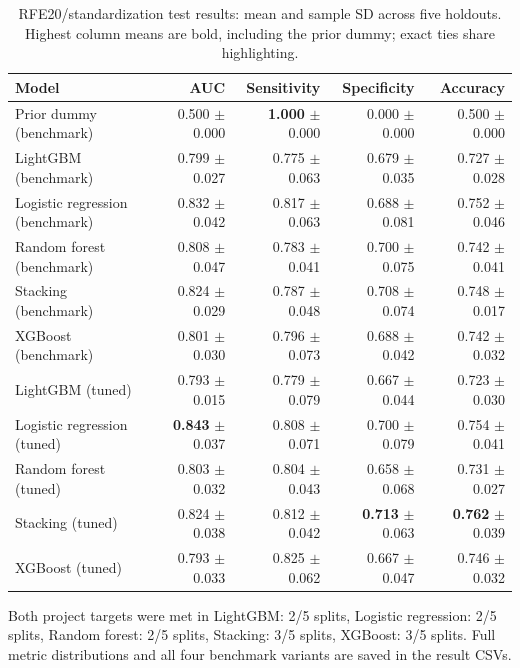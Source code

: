\begin{table}[H]
\centering\small
\caption{RFE20/standardization test results: mean and sample SD across five holdouts. Highest column means are bold, including the prior dummy; exact ties share highlighting.}
\label{tab:holdout-results}
\begin{tabular}{lrrrr}
\toprule
Model & AUC & Sensitivity & Specificity & Accuracy \\
\midrule
Prior dummy (benchmark) & 0.500 $\pm$ 0.000 & \textbf{1.000} $\pm$ 0.000 & 0.000 $\pm$ 0.000 & 0.500 $\pm$ 0.000 \\
LightGBM (benchmark) & 0.799 $\pm$ 0.027 & 0.775 $\pm$ 0.063 & 0.679 $\pm$ 0.035 & 0.727 $\pm$ 0.028 \\
Logistic regression (benchmark) & 0.832 $\pm$ 0.042 & 0.817 $\pm$ 0.063 & 0.688 $\pm$ 0.081 & 0.752 $\pm$ 0.046 \\
Random forest (benchmark) & 0.808 $\pm$ 0.047 & 0.783 $\pm$ 0.041 & 0.700 $\pm$ 0.075 & 0.742 $\pm$ 0.041 \\
Stacking (benchmark) & 0.824 $\pm$ 0.029 & 0.787 $\pm$ 0.048 & 0.708 $\pm$ 0.074 & 0.748 $\pm$ 0.017 \\
XGBoost (benchmark) & 0.801 $\pm$ 0.030 & 0.796 $\pm$ 0.073 & 0.688 $\pm$ 0.042 & 0.742 $\pm$ 0.032 \\
LightGBM (tuned) & 0.793 $\pm$ 0.015 & 0.779 $\pm$ 0.079 & 0.667 $\pm$ 0.044 & 0.723 $\pm$ 0.030 \\
Logistic regression (tuned) & \textbf{0.843} $\pm$ 0.037 & 0.808 $\pm$ 0.071 & 0.700 $\pm$ 0.079 & 0.754 $\pm$ 0.041 \\
Random forest (tuned) & 0.803 $\pm$ 0.032 & 0.804 $\pm$ 0.043 & 0.658 $\pm$ 0.068 & 0.731 $\pm$ 0.027 \\
Stacking (tuned) & 0.824 $\pm$ 0.038 & 0.812 $\pm$ 0.042 & \textbf{0.713} $\pm$ 0.063 & \textbf{0.762} $\pm$ 0.039 \\
XGBoost (tuned) & 0.793 $\pm$ 0.033 & 0.825 $\pm$ 0.062 & 0.667 $\pm$ 0.047 & 0.746 $\pm$ 0.032 \\
\bottomrule
\end{tabular}
\end{table}
Both project targets were met in LightGBM: 2/5 splits, Logistic regression: 2/5 splits, Random forest: 2/5 splits, Stacking: 3/5 splits, XGBoost: 3/5 splits. Full metric distributions and all four benchmark variants are saved in the result CSVs.
